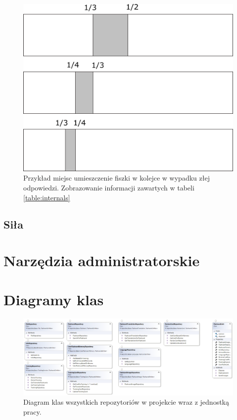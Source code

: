 \begin{figure}[!b]
	\centering
	\includegraphics[width=\textwidth]{images/interval.png}
	 \caption{Przykład miejsc umieszczenie fiszki w kolejce w wypadku złej odpowiedzi. Zobrazowanie informacji zawartych w tabeli \ref{table:internals}}
\end{figure}



\subsection{Siła}

\section{Narzędzia administratorskie}

\section{Diagramy klas}


\begin{figure}[h]
	\centering
	\includegraphics[width=\textwidth]{images/Repos.png}
	 \caption{Diagram klas wszystkich repozytoriów w projekcie wraz z jednostką pracy.}
\end{figure}


